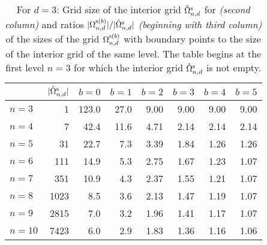 \begin{table}
  \begin{tabular}{l@{\hspace{10mm}}r@{\hspace{10mm}}rrrrrr}
    \toprule
    &
    {$|\mathring{\Omega}_{n,d}^{\mathrm{s}}|$}&
    {$b = 0$}&
    {$b = 1$}&
    {$b = 2$}&
    {$b = 3$}&
    {$b = 4$}&
    {$b = 5$}\\
    \midrule
    $n = 3$&
    \num{1}&
    \num{123.0}&
    \num{27.0}&
    \num{9.00}&
    \num{9.00}&
    \num{9.00}&
    \num{9.00}\\
    $n = 4$&
    \num{7}&
    \num{42.4}&
    \num{11.6}&
    \num{4.71}&
    \num{2.14}&
    \num{2.14}&
    \num{2.14}\\
    $n = 5$&
    \num{31}&
    \num{22.7}&
    \num{7.3}&
    \num{3.39}&
    \num{1.84}&
    \num{1.26}&
    \num{1.26}\\
    $n = 6$&
    \num{111}&
    \num{14.9}&
    \num{5.3}&
    \num{2.75}&
    \num{1.67}&
    \num{1.23}&
    \num{1.07}\\
    $n = 7$&
    \num{351}&
    \num{10.9}&
    \num{4.3}&
    \num{2.37}&
    \num{1.55}&
    \num{1.21}&
    \num{1.07}\\
    $n = 8$&
    \num{1023}&
    \num{8.5}&
    \num{3.6}&
    \num{2.13}&
    \num{1.47}&
    \num{1.19}&
    \num{1.07}\\
    $n = 9$&
    \num{2815}&
    \num{7.0}&
    \num{3.2}&
    \num{1.96}&
    \num{1.41}&
    \num{1.17}&
    \num{1.07}\\
    $n = 10$&
    \num{7423}&
    \num{6.0}&
    \num{2.9}&
    \num{1.83}&
    \num{1.36}&
    \num{1.16}&
    \num{1.06}\\
    \bottomrule
  \end{tabular}
  \caption{%
    For $d = 3$:
    Grid size of the interior grid
    $\mathring{\Omega}_{n,d}^{\mathrm{s}}$ for \emph{(second column)}
    and ratios
    $|\Omega_{n,d}^{\mathrm{s}(b)}|/|\mathring{\Omega}_{n,d}^{\mathrm{s}}|$
    \emph{(beginning with third column)} of the sizes of
    the grid $\Omega_{n,d}^{\mathrm{s}(b)}$ with boundary points
    to the size of the interior grid of the same level.
    The table begins at the first level $n = 3$ for which
    the interior grid $\mathring{\Omega}_{n,d}^{\mathrm{s}}$ is not empty.%
  }
  \label{tbl:coarseBoundary3D}
\end{table}

